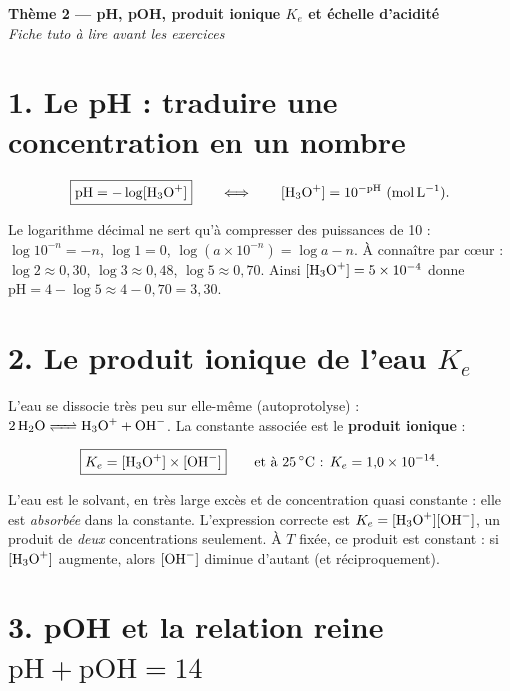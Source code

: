 \documentclass[11pt,a4paper]{article}
\begin{document}
\begin{center}
{\LARGE\bfseries\color{primarydark} Thème 2 --- pH, pOH, produit ionique $K_e$ et échelle d'acidité}\\[3pt]
{\color{primary}\itshape Fiche tuto à lire avant les exercices}
\end{center}

\section*{1. Le pH : traduire une concentration en un nombre}

\begin{formule}[définition du pH]
\[ \boxed{\mathrm{pH} = -\log[\ce{H3O+}]} \qquad\Longleftrightarrow\qquad [\ce{H3O+}] = 10^{-\mathrm{pH}}\ (\si{mol.L^{-1}}). \]
\end{formule}

Le logarithme décimal ne sert qu'à compresser des puissances de 10 : $\log 10^{-n} = -n$, $\log 1 = 0$,
$\log(a\times 10^{-n}) = \log a - n$. À connaître par cœur : $\log 2 \approx 0{,}30$, $\log 3 \approx 0{,}48$,
$\log 5 \approx 0{,}70$. Ainsi $[\ce{H3O+}] = 5\times10^{-4}$ donne
$\mathrm{pH} = 4 - \log 5 \approx 4 - 0{,}70 = 3{,}30$.

\section*{2. Le produit ionique de l'eau $K_e$}

L'eau se dissocie très peu sur elle-même (autoprotolyse) : $\ce{2 H2O <=> H3O+ + OH-}$. La constante associée
est le \textbf{produit ionique} :

\begin{formule}
\[ \boxed{K_e = [\ce{H3O+}]\times[\ce{OH-}]} \qquad\text{et à \SI{25}{\celsius} : } K_e = 1{,}0\times10^{-14}. \]
\end{formule}

\begin{attention}
L'eau est le solvant, en très large excès et de concentration quasi constante : elle est \emph{absorbée} dans
la constante. L'expression correcte est $K_e = [\ce{H3O+}][\ce{OH-}]$, un produit de \emph{deux} concentrations
seulement. À $T$ fixée, ce produit est constant : si $[\ce{H3O+}]$ augmente, alors $[\ce{OH-}]$ diminue
d'autant (et réciproquement).
\end{attention}

\section*{3. pOH et la relation reine $\mathrm{pH}+\mathrm{pOH}=14$}
\end{document}
